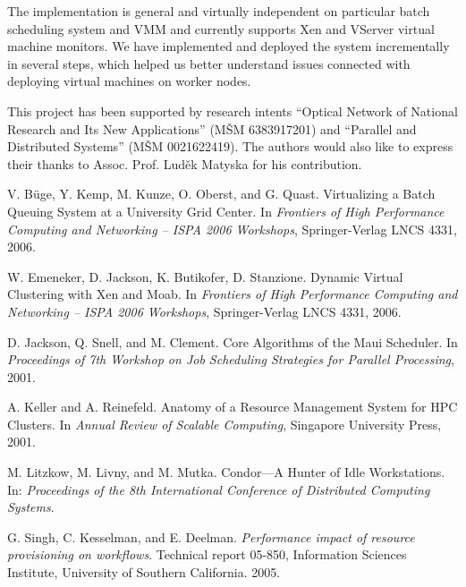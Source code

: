 \documentclass[times,10pt,twocolumn]{article}
\begin{document}
The implementation is general and virtually independent on particular batch
scheduling system and VMM and currently supports Xen and VServer virtual
machine monitors. We have implemented and deployed the system incrementally in
several steps, which helped us better understand issues connected with
deploying virtual machines on worker nodes.



This project has been supported by research intents ``Optical Network of
National Research and Its New Applications'' (M\v{S}M 6383917201) and
``Parallel and Distributed Systems'' (M\v{S}M 0021622419). The authors would
also like to express their thanks to Assoc. Prof. Lud\v{e}k Matyska for his
contribution.


\begin{thebibliography}{99}

V. B\"uge, Y. Kemp, M. Kunze, O. Oberst, and G. Quast.
Virtualizing a Batch Queuing System at a University Grid Center.
In {\em Frontiers of High Performance Computing and Networking -- ISPA 2006
Workshops}, Springer-Verlag LNCS 4331, 2006.

W. Emeneker, D. Jackson, K. Butikofer, D. Stanzione.
Dynamic Virtual Clustering with Xen and Moab.
In {\em Frontiers of High Performance Computing and Networking -- ISPA 2006
Workshops}, Springer-Verlag LNCS 4331, 2006.


D. Jackson, Q. Snell, and M. Clement.
Core Algorithms of the Maui Scheduler.
In {\em Proceedings of 7th Workshop on Job Scheduling Strategies for Parallel
Processing}, 2001.

A. Keller and A. Reinefeld.
Anatomy of a Resource Management System for HPC Clusters.
In {\em Annual Review of Scalable Computing}, Singapore University Press, 2001.

M. Litzkow, M. Livny, and M. Mutka. 
Condor---A Hunter of Idle Workstations.
In: {\em Proceedings of the 8th International Conference of Distributed
Computing Systems}.

G. Singh, C. Kesselman, and E. Deelman.
{\em Performance impact of resource provisioning on workflows}.
Technical report 05-850, Information Sciences Institute,
University of Southern California. 2005.


\end{thebibliography}
\end{document}
